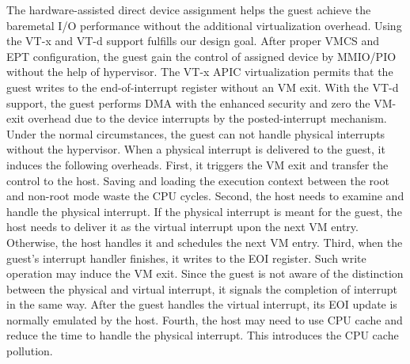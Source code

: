 The hardware-assisted direct device assignment helps the guest
achieve the baremetal I/O performance without the additional
virtualization overhead. Using the VT-x and VT-d support
fulfills our design goal. After proper VMCS and EPT
configuration, the guest gain the control of assigned device
by MMIO/PIO without the help of hypervisor. The VT-x APIC
virtualization permits that the guest writes to the
end-of-interrupt register without an VM exit. With the VT-d
support, the guest performs DMA with the enhanced security and
zero the VM-exit overhead due to the device interrupts by the
posted-interrupt mechanism. Under the normal circumstances,
the guest can not handle physical interrupts without the
hypervisor. When a physical interrupt is delivered to the
guest, it induces the following overheads. First, it triggers
the VM exit and transfer the control to the host. Saving and
loading the execution context between the root and non-root
mode waste the CPU cycles. Second, the host needs to examine
and handle the physical interrupt. If the physical interrupt
is meant for the guest, the host needs to deliver it as the
virtual interrupt upon the next VM entry. Otherwise, the host
handles it and schedules the next VM entry. Third, when the
guest's interrupt handler finishes, it writes to the EOI
register. Such write operation may induce the VM exit. Since
the guest is not aware of the distinction between the physical
and virtual interrupt, it signals the completion of interrupt
in the same way. After the guest handles the virtual
interrupt, its EOI update is normally emulated by the host.
Fourth, the host may need to use CPU cache and reduce the time
to handle the physical interrupt. This introduces the CPU
cache pollution.
